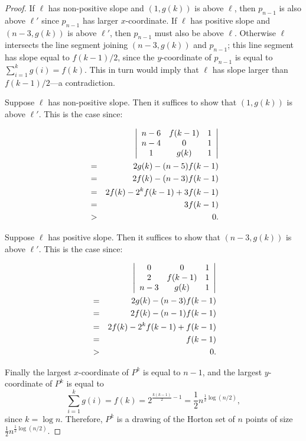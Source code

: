 \documentclass{article}
\begin{document}
\begin{proof}
If $\ell$ has non-positive
slope and $(1,g(k))$ is above $\ell$, then $p_{n-1}$ is also above
$\ell'$ since $p_{n-1}$ has larger $x$-coordinate. If $\ell$ has positive
slope and $(n-3,g(k))$ is above $\ell'$, then $p_{n-1}$ must
also be above $\ell$. Otherwise $\ell$ intersects the line segment
joining $(n-3,g(k))$ and $p_{n-1}$; this line segment
has slope equal to $f(k-1)/2$, since the $y$-coordinate of $p_{n-1}$ is
equal to $\sum_{i=1}^{k} g(i)=f(k)$. This in turn would imply that
$\ell$ has slope larger than $f(k-1)/2$---a contradiction.

Suppose $\ell$ has non-positive slope. Then it suffices
to show that $(1,g(k))$ is above $\ell'$. This is the case
since:

\begin{eqnarray*}
 &  & \hspace{-2em}\left|\begin{array}{ccc}
n-6 & f(k-1) & 1\\
n-4 & 0 & 1\\
1 & g(k) & 1
\end{array}\right|\\
 & = & 2g(k)-(n-5)f(k-1)\\
 & = & 2f(k)-(n-3)f(k-1)\\
 & = & 2f(k)-2^kf(k-1)+3f(k-1)\\
 & = & 3f(k-1)\\
 & > & 0.
\end{eqnarray*}

Suppose $\ell$ has positive slope. Then it suffices
to show that $(n-3,g(k))$ is above $\ell'$. This is the case
since:


\begin{eqnarray*}
 &  & \hspace{-2em}\left|\begin{array}{ccc}
0 & 0 & 1\\
2 & f(k-1) & 1\\
n-3 & g(k) & 1
\end{array}\right|\\
 & = & 2g(k)-(n-3)f(k-1)\\
 & = & 2f(k)-(n-1)f(k-1)\\
 & = & 2f(k)-2^kf(k-1)+f(k-1)\\
 & = & f(k-1)\\
 & > & 0.
\end{eqnarray*}

Finally the largest $x$-coordinate of $P^k$ is equal to $n-1$, and the
largest $y$-coordinate of $P^k$ is equal to 
\[ \sum_{i=1}^{k} g(i)=f(k)=2^{\frac{k(k-1)}{2}-1}=\frac{1}{2} n^{\frac{1}{2} \log (n/2)},\]
since $k=\log n$.
Therefore, $P^k$ is a drawing of the Horton set of $n$ points of size $\frac{1}{2} n^{\frac{1}{2} \log (n/2)}$.
\end{proof}
\end{document}
